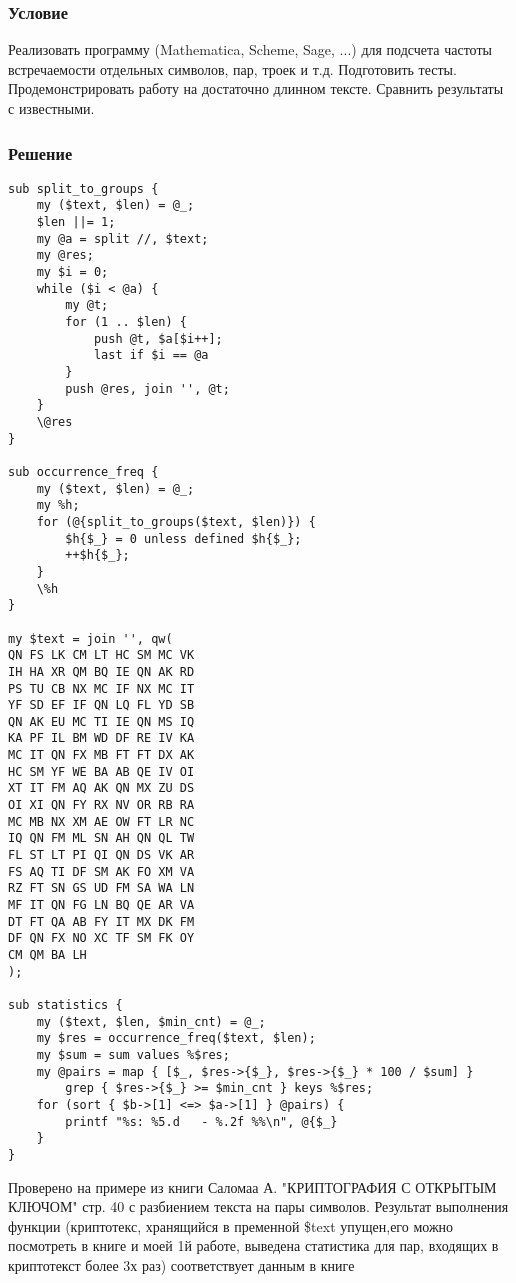 \documentclass[10pt,a4paper]{article}
\begin{document}
\subsubsection*{Условие}
Реализовать программу (Mathematica, Scheme, Sage, ...) для подсчета частоты встречаемости отдельных символов, пар, троек и т.д. Подготовить тесты. Продемонстрировать работу на достаточно длинном тексте. Сравнить результаты с известными. 
\subsubsection*{Решение}

\begin{lstlisting}
sub split_to_groups {
    my ($text, $len) = @_;
    $len ||= 1;
    my @a = split //, $text;
    my @res;
    my $i = 0;
    while ($i < @a) {
        my @t;
        for (1 .. $len) {
            push @t, $a[$i++];
            last if $i == @a
        }
        push @res, join '', @t;
    }
    \@res
}

sub occurrence_freq {
    my ($text, $len) = @_;
    my %h;
    for (@{split_to_groups($text, $len)}) {
        $h{$_} = 0 unless defined $h{$_};
        ++$h{$_};
    }
    \%h
}

my $text = join '', qw(
QN FS LK CM LT HC SM MC VK
IH HA XR QM BQ IE QN AK RD
PS TU CB NX MC IF NX MC IT
YF SD EF IF QN LQ FL YD SB
QN AK EU MC TI IE QN MS IQ
KA PF IL BM WD DF RE IV KA
MC IT QN FX MB FT FT DX AK
HC SM YF WE BA AB QE IV OI
XT IT FM AQ AK QN MX ZU DS
OI XI QN FY RX NV OR RB RA
MC MB NX XM AE OW FT LR NC
IQ QN FM ML SN AH QN QL TW
FL ST LT PI QI QN DS VK AR
FS AQ TI DF SM AK FO XM VA
RZ FT SN GS UD FM SA WA LN
MF IT QN FG LN BQ QE AR VA
DT FT QA AB FY IT MX DK FM
DF QN FX NO XC TF SM FK OY
CM QM BA LH
);

sub statistics {
    my ($text, $len, $min_cnt) = @_;
    my $res = occurrence_freq($text, $len);
    my $sum = sum values %$res;
    my @pairs = map { [$_, $res->{$_}, $res->{$_} * 100 / $sum] }
        grep { $res->{$_} >= $min_cnt } keys %$res;
    for (sort { $b->[1] <=> $a->[1] } @pairs) {
        printf "%s: %5.d   - %.2f %%\n", @{$_}
    }
}

\end{lstlisting}
Проверено на примере из книги Саломаа А. "КРИПТОГРАФИЯ С ОТКРЫТЫМ
КЛЮЧОМ" стр. 40 с разбиением текста на пары символов. 
Результат выполнения функции (криптотекс, хранящийся
в пременной \$text  упущен,его можно посмотреть в книге и моей 1й
работе, выведена статистика для пар, входящих в криптотекст более 3х
раз) соответствует данным в книге
\end{document}
